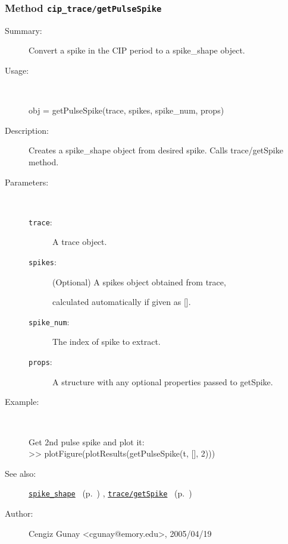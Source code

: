 \subsubsection[Method \texttt{getPulseSpike}]{Method \texttt{cip\_trace/getPulseSpike}}%
%
\label{ref_cip_trace__getPulseSpike}%
\hypertarget{ref_cip_trace__getPulseSpike}{}%
\begin{description}
\item[Summary:]Convert a spike in the CIP period to a spike\_shape object.
%
\item[Usage:]~%
\begin{lyxcode}%
obj = getPulseSpike(trace, spikes, spike\_num, props)
%
\end{lyxcode}%
%
\item[Description:]%
Creates a spike\_shape object from desired spike. Calls trace/getSpike method.
\item[Parameters:]~
\begin{description}%
\item[\texttt{trace}:]
 A trace object.
\item[\texttt{spikes}:]
 (Optional) A spikes object obtained from trace, 

calculated automatically if given as [].
\item[\texttt{spike\_num}:]
 The index of spike to extract.
\item[\texttt{props}:]
 A structure with any optional properties passed to getSpike.
\end{description}%
%
%
\item[Example:]~
\begin{lyxcode} Get 2nd pulse spike and plot it:
\\%
 >> plotFigure(plotResults(getPulseSpike(t, [], 2)))
\\%
\end{lyxcode}
%
\item[See also:]%
\hyperlink{ref_spike_shape}{\texttt{spike\_shape}}%
\ (p.~\pageref{ref_spike_shape})%
%
, \hyperlink{ref_trace__getSpike}{\texttt{trace/getSpike}}%
\ (p.~\pageref{ref_trace__getSpike})%
%
%
\item[Author:]%
Cengiz Gunay <cgunay@emory.edu>, 2005/04/19
%
\end{description}
\methodline%
